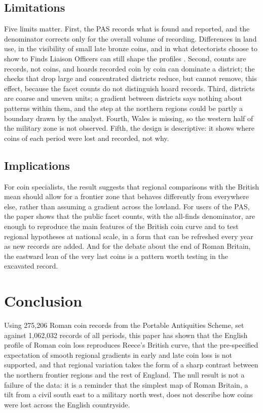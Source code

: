 \documentclass[11pt,a4paper]{article}
\begin{document}
\subsection{Limitations}
Five limits matter. First, the PAS records what is found and reported, and the denominator corrects only for the overall volume of recording. Differences in land use, in the visibility of small late bronze coins, and in what detectorists choose to show to Finds Liaison Officers can still shape the profiles \citep{robbins2012,robbins2013}. Second, counts are records, not coins, and hoards recorded coin by coin can dominate a district; the checks that drop large and concentrated districts reduce, but cannot remove, this effect, because the facet counts do not distinguish hoard records. Third, districts are coarse and uneven units; a gradient between districts says nothing about patterns within them, and the step at the northern regions could be partly a boundary drawn by the analyst. Fourth, Wales is missing, so the western half of the military zone is not observed. Fifth, the design is descriptive: it shows where coins of each period were lost and recorded, not why.

\subsection{Implications}
For coin specialists, the result suggests that regional comparisons with the British mean should allow for a frontier zone that behaves differently from everywhere else, rather than assuming a gradient across the lowland. For users of the PAS, the paper shows that the public facet counts, with the all-finds denominator, are enough to reproduce the main features of the British coin curve and to test regional hypotheses at national scale, in a form that can be refreshed every year as new records are added. And for the debate about the end of Roman Britain, the eastward lean of the very last coins is a pattern worth testing in the excavated record.

\section{Conclusion}\label{sec:conc}
Using 275,206 Roman coin records from the Portable Antiquities Scheme, set against 1,062,032 records of all periods, this paper has shown that the English profile of Roman coin loss reproduces Reece's British curve, that the pre-specified expectation of smooth regional gradients in early and late coin loss is not supported, and that regional variation takes the form of a sharp contrast between the northern frontier regions and the rest of England. The null result is not a failure of the data: it is a reminder that the simplest map of Roman Britain, a tilt from a civil south east to a military north west, does not describe how coins were lost across the English countryside.
\end{document}
